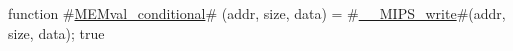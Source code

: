 function #\hyperref[sailMIPSzMEMvalzyconditional]{MEMval\_conditional}# (addr, size, data) = { #\hyperref[sailMIPSzzyzyMIPSzywrite]{\_\_MIPS\_write}#(addr, size, data); true }
